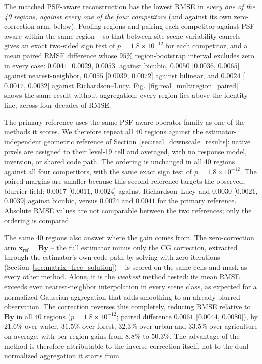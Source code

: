 \documentclass[journal]{IEEEtran}
\newcommand{\psf}{PSF\xspace}
\begin{document}
The matched \psf-aware reconstruction has the lowest RMSE in
\emph{every one of the 40 regions, against every one of the four competitors}
(and against its own zero-correction arm, below).
Pooling regions and pairing each competitor against \psf-aware within the same
region -- so that between-site scene variability cancels -- gives an exact
two-sided sign test of $p=1.8\times10^{-12}$ for each competitor, and a mean
paired RMSE difference whose $95\%$ region-bootstrap interval excludes zero in
every case: $0.0041$ [$0.0029$, $0.0053$] against bicubic, $0.0050$
[$0.0036$, $0.0065$] against nearest-neighbor, $0.0055$ [$0.0039$, $0.0072$]
against bilinear, and $0.0024$ [$0.0017$, $0.0032$] against Richardson--Lucy.
Fig.~\ref{fig:real_multiregion_paired} shows the same result without
aggregation: every region lies above the identity line, across four decades of
RMSE.

The primary reference uses the same \psf-aware operator family as one of the
methods it scores. We therefore repeat all 40 regions against the
estimator-independent geometric reference of
Section~\ref{sec:real_downscale_results}: native pixels are assigned to their
level-19 cell and averaged, with no response model, inversion, or shared code
path. The ordering is unchanged in all 40 regions against all four
competitors, with the same exact sign test of $p=1.8\times10^{-12}$. The paired
margins are smaller because this second reference targets the observed,
blurrier field: $0.0017$ [$0.0011$, $0.0024$] against Richardson--Lucy and
$0.0030$ [$0.0021$, $0.0039$] against bicubic, versus $0.0024$ and $0.0041$
for the primary reference. Absolute RMSE values are not comparable between
the two references; only the ordering is compared.

The same 40 regions also answer where the gain comes from. The
zero-correction arm $\mathbf x_{\mathrm{ref}}=\mathbf B\mathbf y$ -- the
full estimator minus only the CG correction, extracted through the
estimator's own code path by solving with zero iterations
(Section~\ref{sec:matrix_free_solution}) -- is scored on the same cells and
mask as every other method. Alone, it is the \emph{weakest} method tested:
its mean RMSE exceeds even nearest-neighbor interpolation in every scene
class, as expected for a normalized Gaussian aggregation that adds smoothing
to an already blurred observation. The correction reverses this completely,
reducing RMSE relative to $\mathbf B\mathbf y$ in all 40 regions
($p=1.8\times10^{-12}$; paired difference $0.0061$ [$0.0044$, $0.0080$]),
by $21.6\%$ over water, $31.5\%$ over forest, $32.3\%$ over urban and
$33.5\%$ over agriculture on average, with per-region gains from $8.8\%$
to $50.3\%$. The advantage of the method is therefore attributable to the
inverse correction itself, not to the dual-normalized aggregation it starts
from.
\end{document}

